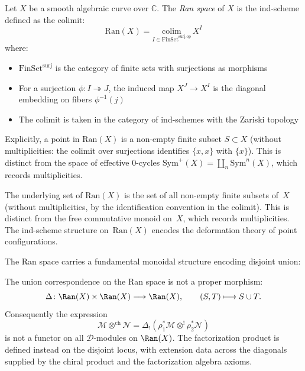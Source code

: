 \begin{definition}\label{def:ran-precise}
Let $X$ be a smooth algebraic curve over $\mathbb{C}$. The \emph{Ran space} of $X$ is the ind-scheme
defined as the colimit:
\[
\text{Ran}(X) = \underset{I \in \text{FinSet}^{\text{surj,op}}}{\text{colim}} \, X^I
\]
where:
\begin{itemize}
\item $\text{FinSet}^{\text{surj}}$ is the category of finite sets with surjections as morphisms
\item For a surjection $\phi: I \twoheadrightarrow J$, the induced map $X^J \to X^I$ is the diagonal
embedding on fibers $\phi^{-1}(j)$
\item The colimit is taken in the category of ind-schemes with the Zariski topology
\end{itemize}
Explicitly, a point in $\text{Ran}(X)$ is a non-empty finite subset $S \subset X$ (without multiplicities: the colimit over surjections identifies $\{x, x\}$ with $\{x\}$). This is distinct from the space of effective 0-cycles $\text{Sym}^+(X) = \coprod_n \text{Sym}^n(X)$, which records multiplicities.
\end{definition}

\begin{remark}
The underlying set of $\text{Ran}(X)$ is the set of all non-empty finite subsets of~$X$
(without multiplicities, by the identification convention in the colimit). This is distinct from
the free commutative monoid on~$X$, which records multiplicities. The ind-scheme structure
on~$\text{Ran}(X)$ encodes the deformation theory of point configurations.
\end{remark}

The Ran space carries a fundamental monoidal structure encoding disjoint union:

\begin{definition}\label{def:factorization}
The union correspondence on the Ran space is not a proper morphism:
\[
\Delta\colon \Ran(X)\times\Ran(X)\longrightarrow \Ran(X),
\qquad (S,T)\longmapsto S\cup T .
\]
Consequently the expression
\[
\mathcal{M} \otimes^{\text{ch}} \mathcal{N}
= \Delta_! \left( \rho_1^* \mathcal{M} \otimes^! \rho_2^* \mathcal{N} \right)
\]
is not a functor on all $\mathcal D$-modules on $\Ran(X)$. The
factorization product is defined instead on the disjoint locus, with
extension data across the diagonals supplied by the chiral product and
the factorization algebra axioms.
\end{definition}

